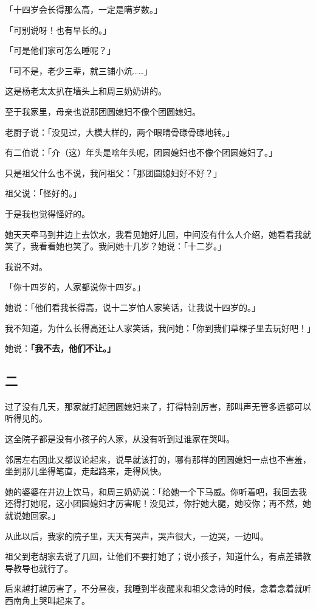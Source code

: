 \documentclass[UTF8]{ctexart}
\begin{document}
「十四岁会长得那么高，一定是瞒岁数。」

「可别说呀！也有早长的。」

「可是他们家可怎么睡呢？」

「可不是，老少三辈，就三铺小炕……」

这是杨老太太扒在墙头上和周三奶奶讲的。

至于我家里，母亲也说那团圆媳妇不像个团圆媳妇。

老厨子说：「没见过，大模大样的，两个眼睛骨碌骨碌地转。」

有二伯说：「介（这）年头是啥年头呢，团圆媳妇也不像个团圆媳妇了。」

只是祖父什么也不说，我问祖父：「那团圆媳妇好不好？」

祖父说：「怪好的。」

于是我也觉得怪好的。

她天天牵马到井边上去饮水，我看见她好儿回，中间没有什么人介绍，她看看我就笑了，我看看她也笑了。我问她十几岁？她说：「十二岁。」

我说不对。

「你十四岁的，人家都说你十四岁。」

她说：「他们看我长得高，说十二岁怕人家笑话，让我说十四岁的。」

我不知道，为什么长得高还让人家笑话，我问她：「你到我们草棵子里去玩好吧！」

她说：\textbf{「我不去，他们不让。」}

\subsection{二}

过了没有几天，那家就打起团圆媳妇来了，打得特别厉害，那叫声无管多远都可以听得见的。

这全院子都是没有小孩子的人家，从没有听到过谁家在哭叫。

邻居左右因此又都议论起来，说早就该打的，哪有那样的团圆媳妇一点也不害羞，坐到那儿坐得笔直，走起路来，走得风快。

她的婆婆在井边上饮马，和周三奶奶说：「给她一个下马威。你听着吧，我回去我还得打她呢，这小团圆媳妇才厉害呢！没见过，你拧她大腿，她咬你；再不然，她就说她回家。」

从此以后，我家的院子里，天天有哭声，哭声很大，一边哭，一边叫。

祖父到老胡家去说了几回，让他们不要打她了；说小孩子，知道什么，有点差错教导教导也就行了。

后来越打越厉害了，不分昼夜，我睡到半夜醒来和祖父念诗的时候，念着念着就听西南角上哭叫起来了。
\end{document}
